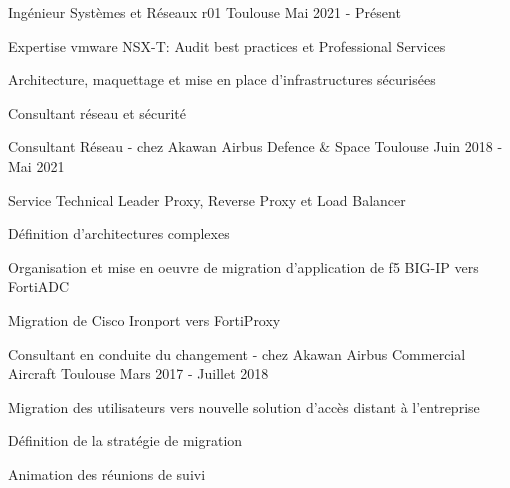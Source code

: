 

\begin{cventries}

  \cventry
    {Ingénieur Systèmes et Réseaux} %
    {r01} %
    {Toulouse} %
    {Mai 2021 - Présent} %
    {
      \begin{cvitems} %
        \item {Expertise vmware NSX-T: Audit best practices et Professional Services}
        \item {Architecture, maquettage et mise en place d'infrastructures sécurisées}
        \item {Consultant réseau et sécurité}
      \end{cvitems}
    }

  \cventry
    {Consultant Réseau - chez Akawan} %
    {Airbus Defence \& Space} %
    {Toulouse} %
    {Juin 2018 - Mai 2021} %
    {
      \begin{cvitems} %
        \item {Service Technical Leader Proxy, Reverse Proxy et Load Balancer}
        \item {Définition d'architectures complexes}
        \item {Organisation et mise en oeuvre de migration d'application de f5 BIG-IP vers FortiADC}
        \item {Migration de Cisco Ironport vers FortiProxy}
      \end{cvitems}
    }

  \cventry
    {Consultant en conduite du changement - chez Akawan} %
    {Airbus Commercial Aircraft} %
    {Toulouse} %
    {Mars 2017 - Juillet 2018} %
    {
      \begin{cvdoubleitems} %
        \item {Migration des utilisateurs vers nouvelle solution d'accès distant à l'entreprise}
        \item {Définition de la stratégie de migration}
        \item {Animation des réunions de suivi}
      \end{cvdoubleitems}
    }


\end{cventries}
